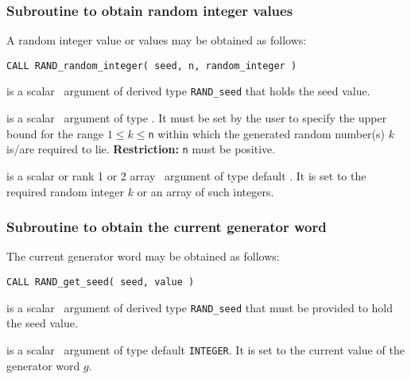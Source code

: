 \documentclass{galahad}
\newcommand{\packagename}{RAND}
\begin{document}

\subsubsection{Subroutine to obtain random integer values}
A random integer value or values may be obtained as follows:
\vspace*{1mm}

\hskip0.5in
{\tt CALL \packagename\_random\_integer( seed, n, random\_integer )}

\vspace*{-2mm}
\begin{description}
 is a scalar \intentinout\ argument of derived type
{\tt \packagename\_seed}  that holds the seed value.

 is a scalar \intentin\ argument of type \integer.
It must be  set by the user to specify the upper bound for the range
$1 \leq k \leq ${\tt n}  within which the generated random number(s) $k$
is/are required to lie.
{\bf Restriction:}  {\tt n} must be positive.

 is a scalar  or rank 1 or 2 array
\intentout\ argument of type default  \integer.
It is set to the required random integer $k$
or an array of such integers.

\end{description}


\subsubsection{Subroutine to obtain the current generator word}
The current generator word may be obtained as follows:
\vspace*{1mm}

\hskip0.5in
{\tt CALL \packagename\_get\_seed( seed, value )}

\vspace*{-2mm}
\begin{description}
 is a scalar \intentin\ argument of derived type
{\tt \packagename\_seed} that must be provided to hold the seed value.

 is a scalar \intentout\ argument of type default
{\tt INTEGER}.
It is set to the current value of the generator \linebreak word $g$.
\end{description}
\end{document}
